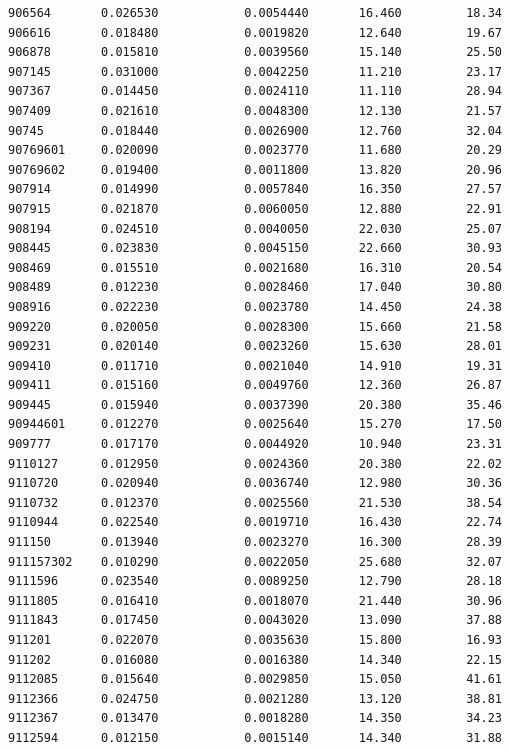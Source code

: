 \documentclass[
  letterpaper,
  DIV=11,
  numbers=noendperiod]{scrartcl}
\begin{document}
\begin{verbatim}
906564       0.026530            0.0054440       16.460         18.34
906616       0.018480            0.0019820       12.640         19.67
906878       0.015810            0.0039560       15.140         25.50
907145       0.031000            0.0042250       11.210         23.17
907367       0.014450            0.0024110       11.110         28.94
907409       0.021610            0.0048300       12.130         21.57
90745        0.018440            0.0026900       12.760         32.04
90769601     0.020090            0.0023770       11.680         20.29
90769602     0.019400            0.0011800       13.820         20.96
907914       0.014990            0.0057840       16.350         27.57
907915       0.021870            0.0060050       12.880         22.91
908194       0.024510            0.0040050       22.030         25.07
908445       0.023830            0.0045150       22.660         30.93
908469       0.015510            0.0021680       16.310         20.54
908489       0.012230            0.0028460       17.040         30.80
908916       0.022230            0.0023780       14.450         24.38
909220       0.020050            0.0028300       15.660         21.58
909231       0.020140            0.0023260       15.630         28.01
909410       0.011710            0.0021040       14.910         19.31
909411       0.015160            0.0049760       12.360         26.87
909445       0.015940            0.0037390       20.380         35.46
90944601     0.012270            0.0025640       15.270         17.50
909777       0.017170            0.0044920       10.940         23.31
9110127      0.012950            0.0024360       20.380         22.02
9110720      0.020940            0.0036740       12.980         30.36
9110732      0.012370            0.0025560       21.530         38.54
9110944      0.022540            0.0019710       16.430         22.74
911150       0.013940            0.0023270       16.300         28.39
911157302    0.010290            0.0022050       25.680         32.07
9111596      0.023540            0.0089250       12.790         28.18
9111805      0.016410            0.0018070       21.440         30.96
9111843      0.017450            0.0043020       13.090         37.88
911201       0.022070            0.0035630       15.800         16.93
911202       0.016080            0.0016380       14.340         22.15
9112085      0.015640            0.0029850       15.050         41.61
9112366      0.024750            0.0021280       13.120         38.81
9112367      0.013470            0.0018280       14.350         34.23
9112594      0.012150            0.0015140       14.340         31.88

\end{verbatim}
\end{document}
